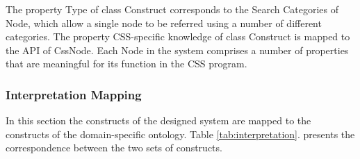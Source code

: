 \documentclass[parskip=full]{uvamscse}
\begin{document}
The property Type of class Construct corresponds to the Search Categories of Node, which allow a
single node to be referred using a number of different categories. The property CSS-specific
knowledge of class Construct is mapped to the API of CssNode. Each Node in the system comprises a
number of properties that are meaningful for its function in the CSS program.


\subsubsection{Interpretation Mapping}

In this section the constructs of the designed system are mapped to the constructs of the
domain-specific ontology. Table \ref{tab:interpretation}. presents the correspondence between the two sets of constructs.
\end{document}
